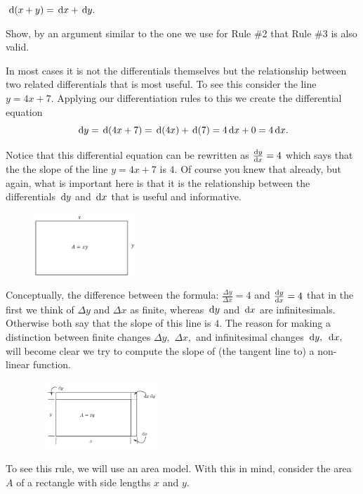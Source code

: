   $\thinspace{\rm d}(x+y)=\thinspace{\rm d}x+\thinspace{\rm d}y.$
\begin{embeddedproblem}{}
  Show, by an argument similar to the one we use for Rule \#2 that
  Rule \#3 is also valid.
\end{embeddedproblem}

In most cases it is not  the differentials themselves but the
relationship between two related differentials that is most useful.
To see this  consider the line $y=4x+7.$ Applying our differentiation rules
to this we create the differential equation 
$$
\thinspace{\rm d}y=\thinspace{\rm d}(4x+7)=\thinspace{\rm d}(4x)+\thinspace{\rm d}(7)=4\thinspace{\rm d}x+0=4\thinspace{\rm d}x.
$$

Notice that this differential equation can be rewritten as
$\frac{\text{d}{y}}{\text{d}{x}}=4$ which says that the 
the slope of the line $y=4x+7$ is $4.$ Of course you knew that
already, but again, what is important here is that it is the
relationship between the differentials $\thinspace{\rm d}y$ and $\thinspace{\rm d}x$ that is
useful and informative.

\begin{figure}
\captionsetup{labelformat=empty}
\centerline{\includegraphics*[height=.75in,width=1.5in]{Figures/ProductRule1}}
\label{fig:}
\end{figure}
Conceptually, the difference between the formula:
$\frac{\Delta y}{\Delta x} =4$ and $\frac{\text{d}{y}}{\text{d}{x}}=4$ that in the first
we think of $\Delta y$ and $\Delta x$ as finite, whereas $\thinspace{\rm d}y$ and
$\thinspace{\rm d}x$ are infinitesimals. Otherwise both say that the slope of this
line is $4.$ The reason for making a distinction between finite
changes $\Delta y,$ $\Delta x,$ and infinitesimal changes $\thinspace{\rm d}y,$
$\thinspace{\rm d}x,$ will become clear we try to compute the slope of (the tangent
line to) a non-linear function.


\begin{figure}
\captionsetup{labelformat=empty}
\centerline{\includegraphics*[height=1in,width=2in]{Figures/ProductRule}}
\label{fig:}
\end{figure}
To see this rule, we will use an area model.  With this in mind,
consider the area $A$ of a rectangle with side lengths $x$ and $y.$ 


